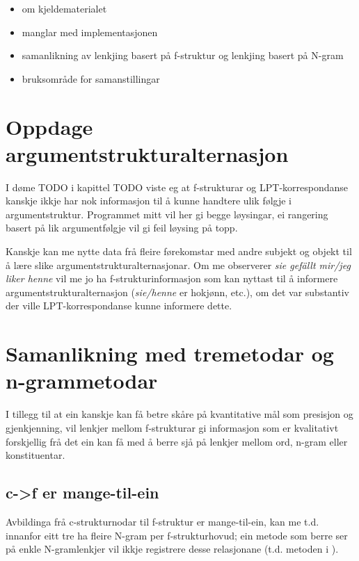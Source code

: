 \documentclass[11pt,a4paper,oneside,draft]{book}
\begin{document}
\label{SEC:diskusjon}

\begin{itemize}
\item om kjeldematerialet
\item manglar med implementasjonen
\item samanlikning av lenkjing basert på f-struktur og lenkjing basert
     på N-gram
\item bruksområde for samanstillingar
\end{itemize}
\section{Oppdage argumentstrukturalternasjon}
\label{sec-5.1}

 I døme TODO i kapittel TODO viste eg at f-strukturar og
LPT-korrespondanse kanskje ikkje har nok informasjon til å kunne
handtere ulik følgje i argumentstruktur. Programmet mitt vil her gi
begge løysingar, ei rangering basert på lik argumentfølgje vil gi feil
løysing på topp.

Kanskje kan me nytte data frå fleire førekomstar med andre subjekt og
objekt til å lære slike argumentstrukturalternasjonar.  Om me
observerer \emph{sie gefällt mir/jeg liker henne} vil me jo ha
f-strukturinformasjon som kan nyttast til å informere
argumentstrukturalternasjon (\emph{sie/henne} er hokjønn, etc.), om det var
substantiv der ville LPT-korrespondanse kunne informere dette.
\section{Samanlikning med tremetodar og n-grammetodar}
\label{sec-5.2}

I tillegg til at ein kanskje kan få betre skåre på kvantitative mål
som presisjon og gjenkjenning, vil lenkjer mellom f-strukturar gi
informasjon som er kvalitativt forskjellig frå det ein kan få med å
berre sjå på lenkjer mellom ord, n-gram eller konstituentar.

\subsection{c->f er mange-til-ein}
\label{sec-5.2.1}

Avbildinga frå c-strukturnodar til f-struktur er mange-til-ein, kan me
t.d. innanfor eitt tre ha fleire N-gram per f-strukturhovud; ein
metode som berre ser på enkle N-gramlenkjer vil ikkje registrere desse
relasjonane (t.d. metoden i \citet{samuelsson2007apa}).
 
\end{document}

